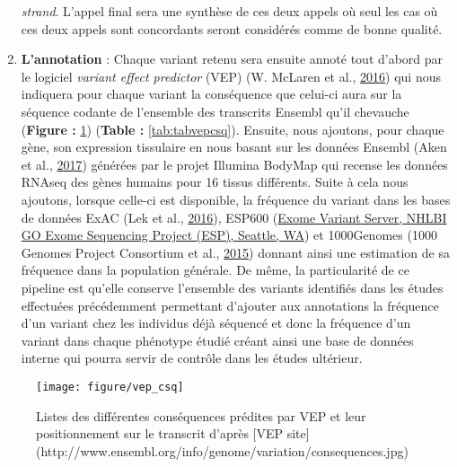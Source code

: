 \documentclass[12pt,twoside]{reedthesis}
\theoremstyle{definition}
\theoremstyle{definition}
\theoremstyle{remark}
\begin{document}
\begin{enumerate}
    \emph{strand}. L'appel final sera une synthèse de ces deux appels où
    seul les cas où ces deux appels sont concordants seront considérés
    comme de bonne qualité.\\
  \item
    \textbf{L'annotation} : Chaque variant retenu sera ensuite annoté tout
    d'abord par le logiciel \emph{variant effect predictor} (VEP) (W.
    McLaren et al., \protect\hyperlink{ref-McLaren2016}{2016}) qui nous
    indiquera pour chaque variant la conséquence que celui-ci aura sur la
    séquence codante de l'ensemble des transcrits Ensembl qu'il chevauche
    (\textbf{Figure : }\ref{fig:figvepcsq}) (\textbf{Table :
    }\ref{tab:tabvepcsq}). Ensuite, nous ajoutons, pour chaque gène, son
    expression tissulaire en nous basant sur les données Ensembl (Aken et
    al., \protect\hyperlink{ref-Aken2017}{2017}) générées par le projet
    Illumina BodyMap qui recense les données RNAseq des gènes humains pour
    16 tissus différents. Suite à cela nous ajoutons, lorsque celle-ci est
    disponible, la fréquence du variant dans les bases de données ExAC
    (Lek et al., \protect\hyperlink{ref-Lek2016}{2016}), ESP600
    (\href{http://evs.gs.washington.edu/EVS/}{Exome Variant Server, NHLBI
    GO Exome Sequencing Project (ESP), Seattle, WA}) et 1000Genomes (1000
    Genomes Project Consortium et al.,
    \protect\hyperlink{ref-1000GenomesProjectConsortium2015}{2015})
    donnant ainsi une estimation de sa fréquence dans la population
    générale. De même, la particularité de ce pipeline est qu'elle
    conserve l'ensemble des variants identifiés dans les études effectuées
    précédemment permettant d'ajouter aux annotations la fréquence d'un
    variant chez les individus déjà séquencé et donc la fréquence d'un
    variant dans chaque phénotype étudié créant ainsi une base de données
    interne qui pourra servir de contrôle dans les études ultérieur.
  \end{enumerate}
  
  \begin{figure}
  
  {\centering \texttt{[image: figure/vep\_csq]} 
  
  }
  
  \caption[Listes des différentes conséquences prédites par VEP et leur positionnement sur le transcrit]{Listes des différentes conséquences prédites par VEP et leur positionnement sur le transcrit d'après [VEP site](http://www.ensembl.org/info/genome/variation/consequences.jpg)}\label{fig:figvepcsq}
  \end{figure}
  
\end{document}
